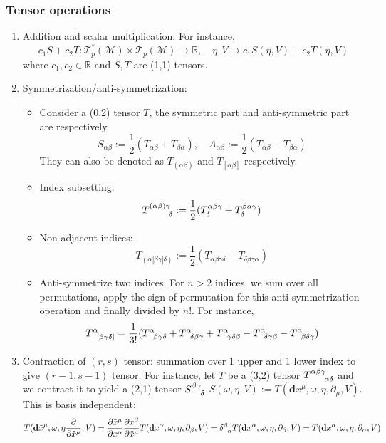 \documentclass[a4paper]{article}
\theoremstyle{new}
\begin{document}
\subsubsection{Tensor operations}
\begin{enumerate}
    \item Addition and scalar multiplication: For instance,
    $$c_1S+c_2T:\mathcal{T}_p^*(\mathcal{M})\times \mathcal{T}_p(\mathcal{M})\rightarrow\mathbb{R},\quad\eta,V\mapsto c_1S(\eta,V)+c_2T(\eta,V)$$
    where $c_1,c_2\in\mathbb{R}$ and $S,T$ are (1,1) tensors.
    \item Symmetrization/anti-symmetrization:
    \begin{itemize}
        \item Consider a (0,2) tensor $T$, the symmetric part and anti-symmetric part are respectively
        $$S_{\alpha\beta}:=\frac{1}{2}(T_{\alpha\beta}+T_{\beta\alpha}),\quad A_{\alpha\beta}:=\frac{1}{2}(T_{\alpha\beta}-T_{\beta\alpha})$$
        They can also be denoted as $T_{(\alpha\beta)}$ and $T_{[\alpha\beta]}$ respectively.
        \item Index subsetting:
        $$\tensor*{T}{*_{}^{(\alpha\beta)\gamma}_{\delta}}:=\frac{1}{2}(T^{\alpha\beta\gamma}_\delta+T^{\beta\alpha\gamma}_\delta)$$
        \item Non-adjacent indices:
        $$T_{(\alpha|\beta\gamma|\delta)}:=\frac{1}{2}(T_{\alpha\beta\gamma\delta}-T_{\delta\beta\gamma\alpha})$$
        \item Anti-symmetrize two indices. For $n>2$ indices, we sum over all permutations, apply the sign of permutation for this anti-symmetrization operation and finally divided by $n!$. For instance,
        $$\tensor*{T}{*_{}^{\alpha}_{[\beta\gamma\delta]}}=\frac{1}{3!}(\tensor*{T}{*_{}^{\alpha}_{\beta\gamma\delta}}+\tensor*{T}{*_{}^{\alpha}_{\delta\beta\gamma}}+\tensor*{T}{*_{}^{\alpha}_{\gamma\delta\beta}}-\tensor*{T}{*_{}^{\alpha}_{\delta\gamma\beta}}-\tensor*{T}{*_{}^{\alpha}_{\beta\delta\gamma}})$$
    \end{itemize}
    \item Contraction of $(r,s)$ tensor: summation over 1 upper and 1 lower index to give $(r-1,s-1)$ tensor. For instance, let $T$ be a (3,2) tensor $\tensor*{T}{*_{}^{\alpha\beta\gamma}_{\alpha\delta}}$ and we contract it to yield a (2,1) tensor $\tensor*{S}{*_{}^{\beta\gamma}_{\delta}}$  $S(\omega,\eta,V):=T(\mathbf{d}x^\mu,\omega,\eta,\partial_\mu,V)$. This is basis independent:
    $$T(\mathbf{d}\tilde{x}^\mu,\omega,\eta\frac{\partial}{\partial\tilde{x}^\mu},V)=\frac{\partial\tilde{x}^\mu}{\partial x^\alpha}\frac{\partial x^\beta}{\partial\tilde{x}^\mu}T(\mathbf{d}x^\alpha,\omega,\eta,\partial_\beta,V)=\tensor*{\delta}{*_{}^{\beta}_{\alpha}}T(\mathbf{d}x^\alpha,\omega,\eta,\partial_\beta,V)=T(\mathbf{d}x^\alpha,\omega,\eta,\partial_\alpha,V)$$

\end{enumerate}
\end{document}
